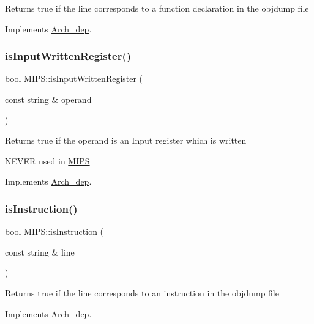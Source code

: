 Returns true if the line corresponds to a function declaration in the objdump file 

Implements \hyperlink{classArch__dep_ae876048f1f6ac62a6f7cb84067189866}{Arch\+\_\+dep}.

\mbox{\label{classMIPS_a9bdb629497575a212f34ee951f1adfe0}} 
\subsubsection{\texorpdfstring{is\+Input\+Written\+Register()}{isInputWrittenRegister()}}
{\footnotesize\ttfamily bool M\+I\+P\+S\+::is\+Input\+Written\+Register (\begin{DoxyParamCaption}\item[{const string \&}]{operand }\end{DoxyParamCaption})\hspace{0.3cm}{\ttfamily [virtual]}}

Returns true if the operand is an Input register which is written

N\+E\+V\+ER used in \hyperlink{classMIPS}{M\+I\+PS} 

Implements \hyperlink{classArch__dep_a3d926dc01afb4aebf1136dbe0962a30d}{Arch\+\_\+dep}.

\mbox{\label{classMIPS_a86a3224889b2d3e2486072b7bc5c26f3}} 
\subsubsection{\texorpdfstring{is\+Instruction()}{isInstruction()}}
{\footnotesize\ttfamily bool M\+I\+P\+S\+::is\+Instruction (\begin{DoxyParamCaption}\item[{const string \&}]{line }\end{DoxyParamCaption})\hspace{0.3cm}{\ttfamily [virtual]}}

Returns true if the line corresponds to an instruction in the objdump file 

Implements \hyperlink{classArch__dep_ac537200db0a4cdd0eb3321b65111ccd5}{Arch\+\_\+dep}.

